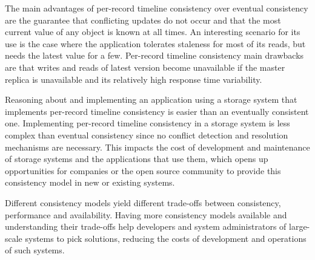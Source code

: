 \documentclass[man,floatsintext,12pt]{apa6}
\begin{document}
The main advantages of per-record timeline consistency over eventual
consistency are the guarantee that conflicting updates do not occur and that
the most current value of any object is known at all times. An interesting
scenario for its use is the case where the application tolerates staleness for
most of its reads, but needs the latest value for a few. Per-record
timeline consistency main drawbacks are that writes and reads of latest version
become unavailable if the master replica is unavailable and its relatively high
response time variability.

Reasoning about and implementing an application using a storage system that
implements per-record timeline consistency is easier than an eventually
consistent one. Implementing per-record timeline consistency in a storage
system is less complex than eventual consistency since no conflict detection
and resolution mechanisms are necessary. This impacts the cost of development
and maintenance of storage systems and the applications that use them, which
opens up opportunities for companies or the open source community to provide
this consistency model in new or existing systems.

Different consistency models yield different trade-offs between consistency,
performance and availability. Having more consistency models available and
understanding their trade-offs help developers and system administrators of
large-scale systems to pick solutions, reducing the costs of development and
operations of such systems.

%
%
\printbibliography
\end{document}
